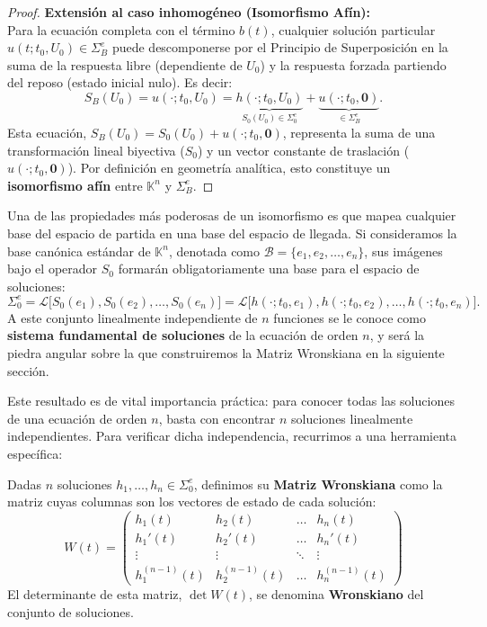 \begin{proof}
    \textbf{Extensión al caso inhomogéneo (Isomorfismo Afín):} \\
    Para la ecuación completa con el término $b(t)$, cualquier solución particular $u(t; t_0, U_0) \in \Sigma_B^e$ puede descomponerse por el Principio de Superposición en la suma de la respuesta libre (dependiente de $U_0$) y la respuesta forzada partiendo del reposo (estado inicial nulo). Es decir:
    \[
        S_B(U_0) = u(\cdot; t_0, U_0) = \underbrace{h(\cdot; t_0, U_0)}_{S_0(U_0) \in \Sigma_0^e} + \underbrace{u(\cdot; t_0, \mathbf{0})}_{\in \Sigma_B^e}.
    \]
    Esta ecuación, $S_B(U_0) = S_0(U_0) + u(\cdot; t_0, \mathbf{0})$, representa la suma de una transformación lineal biyectiva ($S_0$) y un vector constante de traslación ($u(\cdot; t_0, \mathbf{0})$). Por definición en geometría analítica, esto constituye un \textbf{isomorfismo afín} entre $\mathbb{K}^n$ y $\Sigma_B^e$.
\end{proof}

Una de las propiedades más poderosas de un isomorfismo es que mapea cualquier base del espacio de partida en una base del espacio de llegada. Si consideramos la base canónica estándar de $\mathbb{K}^n$, denotada como $\mathcal{B} = \{e_1, e_2, \dots, e_n\}$, sus imágenes bajo el operador $S_0$ formarán obligatoriamente una base para el espacio de soluciones:
\[
    \Sigma_0^e = \mathcal{L} \big[ S_0(e_1), S_0(e_2), \dots, S_0(e_n) \big] = \mathcal{L} \big[ h(\cdot; t_0, e_1), h(\cdot; t_0, e_2), \dots, h(\cdot; t_0, e_n) \big].
\]
A este conjunto linealmente independiente de $n$ funciones se le conoce como \textbf{sistema fundamental de soluciones} de la ecuación de orden $n$, y será la piedra angular sobre la que construiremos la Matriz Wronskiana en la siguiente sección.

Este resultado es de vital importancia práctica: para conocer todas las soluciones de una ecuación de orden $n$, basta con encontrar $n$ soluciones linealmente independientes. Para verificar dicha independencia, recurrimos a una herramienta específica:

\begin{definición}
    Dadas $n$ soluciones $h_1, \dots, h_n \in \Sigma_0^e$, definimos su \textbf{Matriz Wronskiana} como la matriz cuyas columnas son los vectores de estado de cada solución:
    \[
    W(t) = \begin{pmatrix} 
    h_1(t) & h_2(t) & \dots & h_n(t) \\ 
    h_1'(t) & h_2'(t) & \dots & h_n'(t) \\ 
    \vdots & \vdots & \ddots & \vdots \\ 
    h_1^{(n-1)}(t) & h_2^{(n-1)}(t) & \dots & h_n^{(n-1)}(t) 
    \end{pmatrix}
    \]
    El determinante de esta matriz, $\det W(t)$, se denomina \textbf{Wronskiano} del conjunto de soluciones.
\end{definición}

